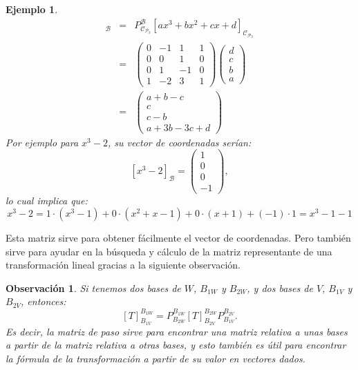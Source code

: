 \documentclass[12pt]{book}
\newtheorem{obs}{Observaci\'on}
\newtheorem{ejem}{Ejemplo}
\def\P{\mathcal{P}}
\def\B{\mathcal{B}}
\def\Ccal{\mathcal{C}}
\begin{document}
\begin{ejem}
{\begin{eqnarray*}
[ax^3+bx^2+cx+d]_{\B}&=&P_{\Ccal_{\P_3}}^{\B} [ax^3+bx^2+cx+d]_{\Ccal_{\P_3}}\\
&=&\left(\begin{array}{rrrr}
0&-1&1&1\\
0&0&1&0\\
0&1&-1&0\\
1&-2&3&1
\end{array}\right)
\left(\begin{array}{c} d\\c\\b\\a\end{array} \right)\\
&=& \left(\begin{array}{c} a+b-c\\c\\c-b\\a+3b-3c+d\end{array} \right)
\end{eqnarray*}
Por ejemplo para $x^3-2$, su vector de coordenadas serían:
$$[x^3-2]_{\B}=\left(\begin{array}{c} 1\\0\\0\\-1\end{array} \right),$$
lo cual implica que:
$$x^3-2= 1\cdot(x^3-1)+0\cdot( x^2+x-1)+0\cdot( x+1)+(-1)\cdot1=x^3-1-1$$
}
\end{ejem}

Esta matriz sirve para obtener fácilmente el vector de coordenadas.
Pero también sirve para ayudar en la búsqueda y cálculo de la matriz representante de una transformación lineal gracias a la siguiente observación.

\begin{obs}
Si tenemos dos bases de $W$, $B_{1W}$ y $B_{2W}$, y dos bases de $V$, $B_{1V}$ y $B_{2V}$, entonces:
$$ [T]_{B_{1V}}^{B_{1W}}=P_{B_{2W}}^{B_{1W}} [T]_{B_{2V}}^{B_{2W}} P_{B_{1V}}^{B_{2V}}.$$
Es decir, la matriz de paso sirve para encontrar una matriz relativa a unas bases a partir de la matriz relativa a otras bases, y esto también es útil para encontrar la fórmula de la transformación a partir de su valor en vectores dados.
\end{obs}
\end{document}
